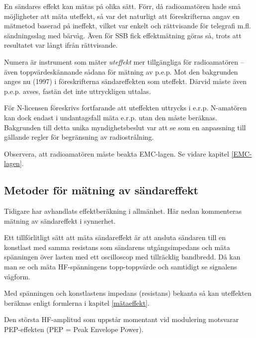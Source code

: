 \begin{rev-omarbetas}
En sändares effekt kan mätas på olika sätt.  Förr, då radioamatören
hade små möjligheter att mäta uteffekt, så var det naturligt att
föreskrifterna angav en mätmetod baserad på ineffekt, vilket var
enkelt och rättvisande för telegrafi m.fl. sändningsslag med bärvåg.
Även för SSB fick effektmätning göras så, trots att resultatet var
långt ifrån rättvisande.

Numera är instrument som mäter \emph{uteffekt} mer tillgängliga för
radioamatören -- även toppvärdeskännande sådana för mätning av
p.e.p. Mot den bakgrunden anges nu (1997) i föreskrifterna
sändareffekten som uteffekt.  Därvid måste även p.e.p. avses, fastän
det inte uttryckligen uttalas.

\end{rev-omarbetas}

\begin{rev-raderas}
För N-licensen föreskrivs fortfarande att uteffekten uttrycks i
e.r.p. N-amatören kan dock endast i undantagsfall mäta e.r.p. utan den
måste beräknas. Bakgrunden till detta unika myndighetsbeslut var att
se som en anpassning till gällande regler för begränsning av
radiostrålning.

\end{rev-raderas}

Observera, att radioamatören måste beakta EMC-lagen. Se vidare kapitel
\ref{EMC-lagen}.

\subsection{Metoder för mätning av sändareffekt}

Tidigare har avhandlats effektberäkning i allmänhet. Här nedan
kommenteras mätning av sändareffekt i synnerhet.

Ett tillförlitligt sätt att mäta sändareffekt är att ansluta sändaren
till en konstlast med samma resistans som sändarens utgångsimpedans
och mäta spänningen över lasten med ett oscilloscop med tillräcklig
bandbredd. Då kan man se och mäta HF-spänningens topp-toppvärde och
samtidigt se signalens vågform.

Med spänningen och konstlastens impedans (resistans) bekanta så kan
uteffekten beräknas enligt formlerna i kapitel \ref{mätaeffekt}.

Den största HF-amplitud som uppstår momentant vid modulering motsvarar
PEP-effekten (PEP = Peak Envelope Power).

